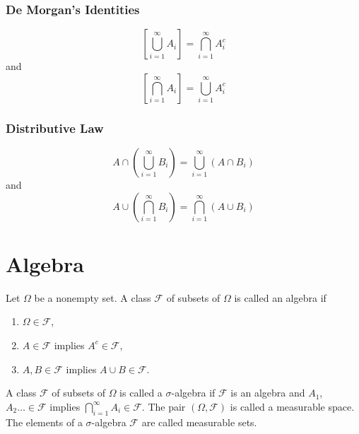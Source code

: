 \subsubsection{De Morgan's Identities}

\begin{equation}
\left[\bigcup_{i=1}^\infty A_i\right]=\bigcap_{i=1}^\infty A_i^c
\end{equation}
and
\begin{equation}
\left[\bigcap_{i=1}^\infty A_i\right]=\bigcup_{i=1}^\infty A_i^c
\end{equation}

\subsubsection{Distributive Law}

\begin{equation}
A\cap\left(\bigcup_{i=1}^{\infty} B_i\right)=\bigcup_{i=1}^\infty(A\cap B_i)
\end{equation}
and
\begin{equation}
A\cup\left(\bigcap_{i=1}^{\infty} B_i\right)=\bigcap_{i=1}^\infty(A\cup B_i)
\end{equation}


\section{Algebra}

\begin{definition}[Algebra]
Let $\Omega$ be a nonempty set. A class $\mathcal F$ of subsets of $\Omega$ is called
an algebra if
\begin{enumerate}[label=\roman*.]
	\item $\Omega \in \mathcal F$,
	\item $A \in \mathcal F$ implies $A^c\in \mathcal F$,
	\item $A,B\in \mathcal F$ implies $A\cup B\in \mathcal F$.
\end{enumerate}
\end{definition}



\begin{definition}
A class $\mathcal F$ of subsets of $\Omega$ is called a $\sigma$-algebra if $\mathcal F$
is an algebra and $A_1$, $A_2\ldots \in \mathcal F$  implies $\bigcap_{i=1}^\infty A_i\in\mathcal F$.
The pair $(\Omega, \mathcal F)$ is called a measurable space. The elements of a $\sigma$-algebra 
$\mathcal F$ are called measurable sets.
\end{definition}

